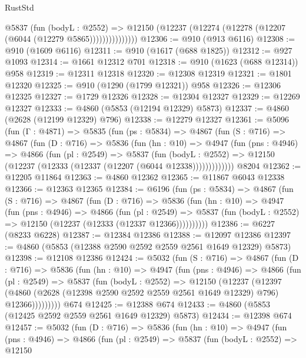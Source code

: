 \begin{lexlean}{RustStd}
\begin{coremodule}
                  @5837
                    (fun (bodyL : @2552) =>
                    @12150 (@12237 (@12274 (@12278 (@12207 (@6044 (@12279 @5865)))))))))))))))
@12306 := @910 (@913 @6116)
@12308 := @910 (@1609 @6116)
@12311 := @910 (@1617 (@688 @1825))
@12312 := @927 @1093
@12314 := @1661 @12312 @701
@12318 := @910 (@1623 (@688 @12314)) @958
@12319 := @12311 @12318
@12320 := @12308 @12319
@12321 := @1801 @12320
@12325 := @910 (@1290 (@1799 @12321)) @958
@12326 := @12306 @12325
@12327 := @1729 @12326
@12328 := @12304 @12327
@12329 := @12269 @12327
@12333 := @4860 (@5853 (@12194 @12329) @5873)
@12337 := @4860 (@2628 (@12199 @12329) @796)
@12338 := @12279 @12327
@12361 := @5096
    (fun (Γ : @4871) =>
    @5835
      (fun (ps : @5834) =>
      @4867
        (fun (S : @716) =>
        @4867
          (fun (D : @716) =>
          @5836
            (fun (hn : @10) =>
            @4947
              (fun (pns : @4946) =>
              @4866
                (fun (pl : @2549) =>
                @5837
                  (fun (bodyL : @2552) =>
                  @12150 (@12237 (@12333 (@12337 (@12207 (@6044 @12338)))))))))))))
    @8204
@12362 := @12205 @11864
@12363 := @4860 @12362
@12365 := @11867 @6043 @12338
@12366 := @12363 @12365
@12384 := @6196
    (fun (ps : @5834) =>
    @4867
      (fun (S : @716) =>
      @4867
        (fun (D : @716) =>
        @5836
          (fun (hn : @10) =>
          @4947
            (fun (pns : @4946) =>
            @4866
              (fun (pl : @2549) =>
              @5837 (fun (bodyL : @2552) => @12150 (@12237 (@12333 (@12337 @12366))))))))))
@12386 := @6227 (@8233 @6228)
@12387 := @12384 @12386
@12388 := @12097 @12386
@12397 := @4860 (@5853 (@12388 @2590 @2592 @2559 @2561 @1649 @12329) @5873)
@12398 := @12108 @12386
@12424 := @5032
    (fun (S : @716) =>
    @4867
      (fun (D : @716) =>
      @5836
        (fun (hn : @10) =>
        @4947
          (fun (pns : @4946) =>
          @4866
            (fun (pl : @2549) =>
            @5837
              (fun (bodyL : @2552) =>
              @12150
                (@12237
                  (@12397
                    (@4860
                      (@2628 (@12398 @2590 @2592 @2559 @2561 @1649 @12329) @796)
                      @12366)))))))))
    @674
@12425 := @12388 @674
@12433 := @4860 (@5853 (@12425 @2592 @2559 @2561 @1649 @12329) @5873)
@12434 := @12398 @674
@12457 := @5032
    (fun (D : @716) =>
    @5836
      (fun (hn : @10) =>
      @4947
        (fun (pns : @4946) =>
        @4866
          (fun (pl : @2549) =>
          @5837
            (fun (bodyL : @2552) =>
            @12150

\end{coremodule}
\end{lexlean}
